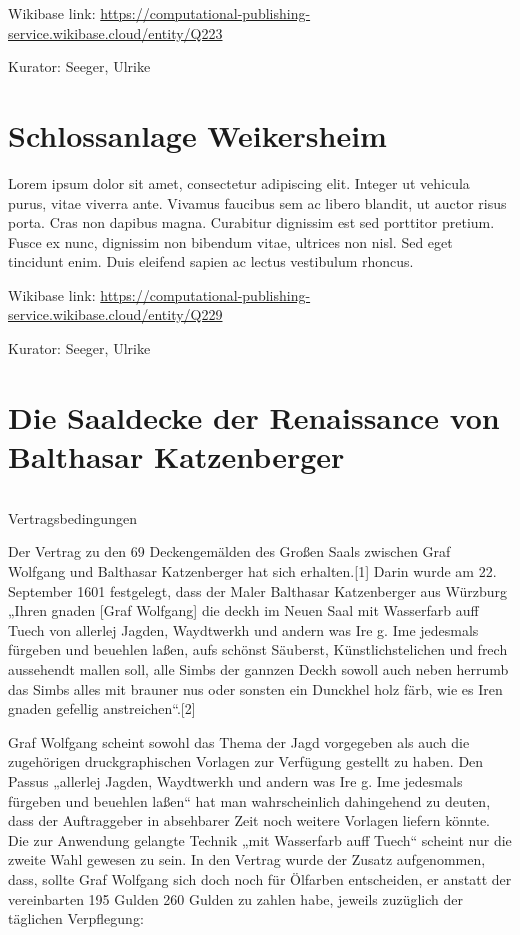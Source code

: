 \documentclass[
  letterpaper,
]{book}
\makeatletter
\let\oldsubparagraph\subparagraph
\renewcommand{\subparagraph}{
    \@ifstar
      \xxxSubParagraphStar
      \xxxSubParagraphNoStar
  }
\newcommand{\xxxSubParagraphStar}[1]{\oldsubparagraph*{#1}\mbox{}}
\newcommand{\xxxSubParagraphNoStar}[1]{\oldsubparagraph{#1}\mbox{}}
\makeatother
\begin{document}
Wikibase link:
\url{https://computational-publishing-service.wikibase.cloud/entity/Q223}

Kurator: Seeger, Ulrike


\chapter{Schlossanlage Weikersheim}\label{schlossanlage-weikersheim-1}

Lorem ipsum dolor sit amet, consectetur adipiscing elit. Integer ut
vehicula purus, vitae viverra ante. Vivamus faucibus sem ac libero
blandit, ut auctor risus porta. Cras non dapibus magna. Curabitur
dignissim est sed porttitor pretium. Fusce ex nunc, dignissim non
bibendum vitae, ultrices non nisl. Sed eget tincidunt enim. Duis
eleifend sapien ac lectus vestibulum rhoncus.

Wikibase link:
\url{https://computational-publishing-service.wikibase.cloud/entity/Q229}

Kurator: Seeger, Ulrike


\chapter{Die Saaldecke der Renaissance von Balthasar
Katzenberger}\label{die-saaldecke-der-renaissance-von-balthasar-katzenberger}

\subparagraph{Vertragsbedingungen}\label{vertragsbedingungen}

Der Vertrag zu den 69 Deckengemälden des Großen Saals zwischen Graf
Wolfgang und Balthasar Katzenberger hat sich erhalten.{[}1{]} Darin
wurde am 22. September 1601 festgelegt, dass der Maler Balthasar
Katzenberger aus Würzburg „Ihren gnaden {[}Graf Wolfgang{]} die deckh im
Neuen Saal mit Wasserfarb auff Tuech von allerlej Jagden, Waydtwerkh und
andern was Ire g. Ime jedesmals fürgeben und beuehlen laßen, aufs
schönst Säuberst, Künstlichstelichen und frech aussehendt mallen soll,
alle Simbs der gannzen Deckh sowoll auch neben herrumb das Simbs alles
mit brauner nus oder sonsten ein Dunckhel holz färb, wie es Iren gnaden
gefellig anstreichen``.{[}2{]}

Graf Wolfgang scheint sowohl das Thema der Jagd vorgegeben als auch die
zugehörigen druckgraphischen Vorlagen zur Verfügung gestellt zu haben.
Den Passus „allerlej Jagden, Waydtwerkh und andern was Ire g. Ime
jedesmals fürgeben und beuehlen laßen`` hat man wahrscheinlich
dahingehend zu deuten, dass der Auftraggeber in absehbarer Zeit noch
weitere Vorlagen liefern könnte. Die zur Anwendung gelangte Technik „mit
Wasserfarb auff Tuech`` scheint nur die zweite Wahl gewesen zu sein. In
den Vertrag wurde der Zusatz aufgenommen, dass, sollte Graf Wolfgang
sich doch noch für Ölfarben entscheiden, er anstatt der vereinbarten 195
Gulden 260 Gulden zu zahlen habe, jeweils zuzüglich der täglichen
Verpflegung:
\end{document}
